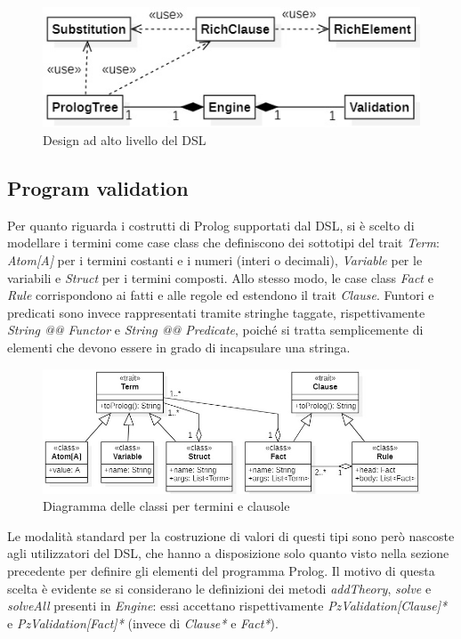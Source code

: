 \begin{figure}[th]
\centering
\includegraphics[scale=1.02]{images/DiagramDesign}
\decoRule
\caption[DiagramDesign]{Design ad alto livello del DSL}
\end{figure}

\subsection{Program validation}

Per quanto riguarda i costrutti di Prolog supportati dal DSL, si è scelto di modellare i termini come case class che definiscono dei sottotipi del trait \textit{Term}: \textit{Atom[A]} per i termini costanti e i numeri (interi o decimali), \textit{Variable} per le variabili e \textit{Struct} per i termini composti. Allo stesso modo, le case class \textit{Fact} e \textit{Rule} corrispondono ai fatti e alle regole ed estendono il trait \textit{Clause}. Funtori e predicati sono invece rappresentati tramite stringhe taggate, rispettivamente \textit{String @@ Functor} e \textit{String @@ Predicate}, poiché si tratta semplicemente di elementi che devono essere in grado di incapsulare una stringa.

\begin{figure}[th]
\centering
\includegraphics[scale=0.86]{images/DiagramClauseTerm}
\decoRule
\caption[DiagramClauseTerm]{Diagramma delle classi per termini e clausole}
\end{figure}

Le modalità standard per la costruzione di valori di questi tipi sono però nascoste agli utilizzatori del DSL, che hanno a disposizione solo quanto visto nella sezione precedente per definire gli elementi del programma Prolog. Il motivo di questa scelta è evidente se si considerano le definizioni dei metodi \textit{addTheory}, \textit{solve} e \textit{solveAll} presenti in \textit{Engine}: essi accettano rispettivamente \textit{PzValidation[Clause]*} e \textit{PzValidation[Fact]*} (invece di \textit{Clause*} e \textit{Fact*}).

